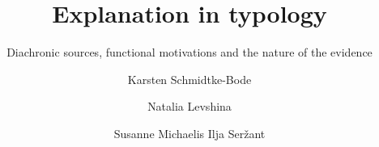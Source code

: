 \title{Explanation in typology}
\subtitle{Diachronic sources, functional motivations and the nature of the evidence}  
\BackBody{~}
\author{ 
Karsten Schmidtke-Bode 			
\and
Natalia Levshina 			
\and
Susanne Michaelis 			
\lastand
Ilja Seržant }
\renewcommand{\lsSeries}{cfls} %
\renewcommand{\lsSeriesNumber}{} %


